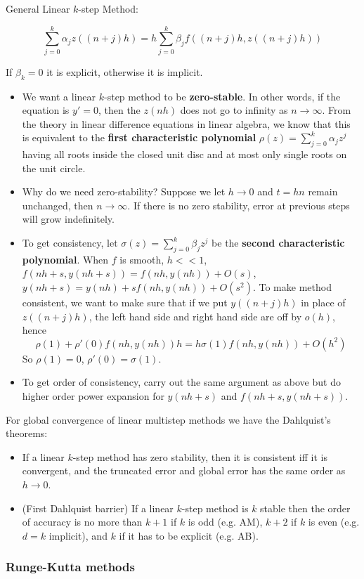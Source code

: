\documentclass[20pt]{article} %
\theoremstyle{break}
\begin{document}
General Linear $k$-step Method:

\[\sum_{j=0}^k\alpha_jz((n+j)h)=h\sum_{j=0}^k\beta_jf((n+j)h, z((n+j)h))\]

If $\beta_k=0$ it is explicit, otherwise it is implicit.

\begin{itemize}  
\item We want a linear $k$-step method to be {\bf zero-stable}. In other words, if the equation is $y'=0$, then the $z(nh)$ does not go to infinity as $n\rightarrow\infty$. From the theory in linear difference equations in linear algebra, we know that this is equivalent to the {\bf first characteristic polynomial} $\rho(z)=\sum_{j=0}^k\alpha_jz^j$ having all roots inside the closed unit disc and at most only single roots on the unit circle.
\item Why do we need zero-stability? Suppose we let $h\rightarrow 0$ and $t=hn$ remain unchanged, then $n\rightarrow\infty$. If there is no zero stability, error at previous steps will grow indefinitely.
\end{itemize}

\newpage

\begin{itemize}
\item To get consistency, let $\sigma(z)=\sum_{j=0}^k\beta_jz^j$ be the {\bf second characteristic polynomial}. When $f$ is smooth, $h<<1$, $f(nh+s, y(nh+s))=f(nh, y(nh))+O(s)$, $y(nh+s)=y(nh)+sf(nh, y(nh))+O(s^2)$. To make method consistent, we want to make sure that if we put $y((n+j)h)$ in place of $z((n+j)h)$, the left hand side and right hand side are off by $o(h)$, hence
  \[\rho(1)+\rho'(0)f(nh, y(nh))h=h\sigma(1)f(nh, y(nh))+O(h^2)\]
  So $\rho(1)=0$, $\rho'(0)=\sigma(1)$.
\item To get order of consistency, carry out the same argument as above but do higher order power expansion for $y(nh+s)$ and $f(nh+s, y(nh+s))$.
\end{itemize}

\newpage

For global convergence of linear multistep methods we have the Dahlquist's theorems:
\begin{itemize}
\item If a linear $k$-step method has zero stability, then it is consistent iff it is convergent, and the truncated error and global error has the same order as $h\rightarrow 0$.
\item (First Dahlquist barrier) If a linear $k$-step method is $k$ stable then the order of accuracy is no more than $k+1$ if $k$ is odd (e.g. AM), $k+2$ if $k$ is even (e.g. $d=k$ implicit), and $k$ if it has to be explicit (e.g. AB).
\end{itemize}

\newpage

\subsubsection{Runge-Kutta methods}



  
\end{document}
